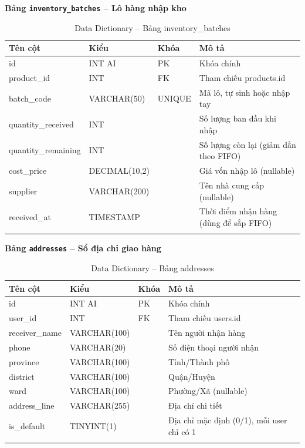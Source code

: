\documentclass[a4paper]{article}
\begin{document}
\textbf{Bảng \texttt{inventory\_batches} -- Lô hàng nhập kho}

\begin{longtable}{|p{3.5cm}|p{2.5cm}|p{1.5cm}|p{5cm}|}
\hline
\textbf{Tên cột} & \textbf{Kiểu} & \textbf{Khóa} & \textbf{Mô tả} \\
\hline
\endhead
id & INT AI & PK & Khóa chính \\
\hline
product\_id & INT & FK & Tham chiếu products.id \\
\hline
batch\_code & VARCHAR(50) & UNIQUE & Mã lô, tự sinh hoặc nhập tay \\
\hline
quantity\_received & INT & & Số lượng ban đầu khi nhập \\
\hline
quantity\_remaining & INT & & Số lượng còn lại (giảm dần theo FIFO) \\
\hline
cost\_price & DECIMAL(10,2) & & Giá vốn nhập lô (nullable) \\
\hline
supplier & VARCHAR(200) & & Tên nhà cung cấp (nullable) \\
\hline
received\_at & TIMESTAMP & & Thời điểm nhận hàng (dùng để sắp FIFO) \\
\hline
\caption{Data Dictionary -- Bảng inventory\_batches}
\end{longtable}

\textbf{Bảng \texttt{addresses} -- Sổ địa chỉ giao hàng}

\begin{longtable}{|p{3.5cm}|p{2.5cm}|p{1.5cm}|p{5cm}|}
\hline
\textbf{Tên cột} & \textbf{Kiểu} & \textbf{Khóa} & \textbf{Mô tả} \\
\hline
\endhead
id & INT AI & PK & Khóa chính \\
\hline
user\_id & INT & FK & Tham chiếu users.id \\
\hline
receiver\_name & VARCHAR(100) & & Tên người nhận hàng \\
\hline
phone & VARCHAR(20) & & Số điện thoại người nhận \\
\hline
province & VARCHAR(100) & & Tỉnh/Thành phố \\
\hline
district & VARCHAR(100) & & Quận/Huyện \\
\hline
ward & VARCHAR(100) & & Phường/Xã (nullable) \\
\hline
address\_line & VARCHAR(255) & & Địa chỉ chi tiết \\
\hline
is\_default & TINYINT(1) & & Địa chỉ mặc định (0/1), mỗi user chỉ có 1 \\
\hline
\caption{Data Dictionary -- Bảng addresses}
\end{longtable}
\end{document}
